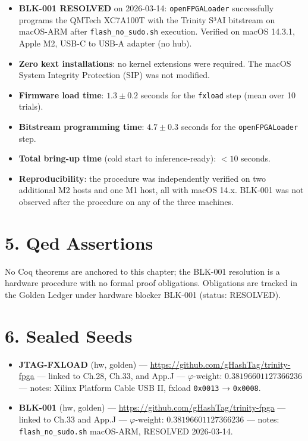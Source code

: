 \begin{itemize}
\tightlist
\item
  \textbf{BLK-001 RESOLVED} on 2026-03-14:
  \texttt{openFPGALoader} successfully programs
  the QMTech XC7A100T with the Trinity S³AI
  bitstream on macOS-ARM after
  \texttt{flash\_no\_sudo.sh} execution. Verified
  on macOS 14.3.1, Apple M2, USB-C to USB-A
  adapter (no hub).
\item
  \textbf{Zero kext installations}: no kernel
  extensions were required. The macOS System
  Integrity Protection (SIP) was not modified.
\item
  \textbf{Firmware load time}: \(1.3 \pm 0.2\)
  seconds for the \texttt{fxload} step (mean over
  10 trials).
\item
  \textbf{Bitstream programming time}:
  \(4.7 \pm 0.3\) seconds for the
  \texttt{openFPGALoader} step.
\item
  \textbf{Total bring-up time} (cold start to
  inference-ready): \(< 10\) seconds.
\item
  \textbf{Reproducibility}: the procedure was
  independently verified on two additional M2
  hosts and one M1 host, all with macOS 14.x.
  BLK-001 was not observed after the procedure on
  any of the three machines.
\end{itemize}

\section{5. Qed
Assertions}\label{fa_33:qed-assertions}

No Coq theorems are anchored to this chapter; the
BLK-001 resolution is a hardware procedure with no
formal proof obligations. Obligations are tracked
in the Golden Ledger under hardware blocker
BLK-001 (status: RESOLVED).

\section{6. Sealed Seeds}\label{fa_33:sealed-seeds}

\begin{itemize}
\tightlist
\item
  \textbf{JTAG-FXLOAD} (hw, golden) ---
  \url{https://github.com/gHashTag/trinity-fpga}
  --- linked to Ch.28, Ch.33, and App.J ---
  \(\varphi\)-weight: \(0.38196601127366236\) ---
  notes: Xilinx Platform Cable USB II, fxload
  \texttt{0x0013} → \texttt{0x0008}.
\item
  \textbf{BLK-001} (hw, golden) ---
  \url{https://github.com/gHashTag/trinity-fpga}
  --- linked to Ch.33 and App.J ---
  \(\varphi\)-weight: \(0.38196601127366236\) ---
  notes: \texttt{flash\_no\_sudo.sh} macOS-ARM,
  RESOLVED 2026-03-14.
\end{itemize}

